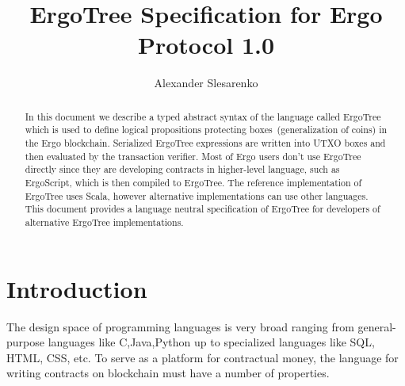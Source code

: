 \documentclass[11pt]{article}
\newcommand{\ASDag}{ErgoTree\xspace}
\begin{document}
\title{\ASDag Specification for Ergo Protocol 1.0}

\author{Alexander Slesarenko}

\maketitle

\begin{abstract}
In this document we describe a typed abstract syntax of the language called \ASDag
which is used to define logical propositions protecting boxes~(generalization of
coins) in the Ergo blockchain. Serialized \ASDag expressions are written into UTXO
boxes and then evaluated by the transaction verifier. Most of Ergo users don't use
\ASDag directly since they are developing contracts in higher-level language, such as
ErgoScript, which is then compiled to \ASDag. The reference implementation of \ASDag
uses Scala, however alternative implementations can use other languages. This document
provides a language neutral specification of \ASDag for developers of alternative
\ASDag implementations.

\end{abstract}

\tableofcontents

\section{Introduction}
\label{sec:intro}

The design space of programming languages is very broad ranging from general-purpose
languages like C,Java,Python up to specialized languages like SQL, HTML, CSS, etc. To
serve as a platform for contractual money, the language for writing contracts on
blockchain must have a number of properties.
\end{document}
